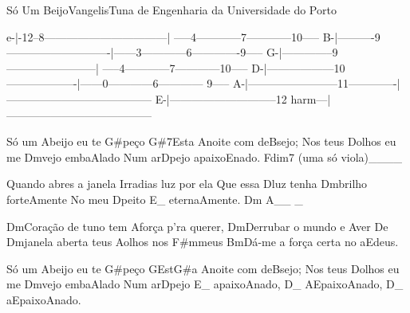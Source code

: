\begin{musica}{Só Um Beijo}{Vangelis}{Tuna de Engenharia da Universidade do Porto}

\begin{tablatura}[xleftmargin=2.0cm]
e-|-12--8---------------------------------| -----4------------7------------10-----
B-|----------9----------------------------|------3------------6-------------9-----
G-|--------------9------------------------| -----4------------7------------10-----
D-|------------------10-------------------|------0------------6------------ 9-----
A-|------------------------11-------------|---------------------------------------
E-|-----------------------------12 harm---|---------------------------------------
\end{tablatura}

Só um \ac{A}{bei}jo eu te \ac{G#}{pe}ço
\ac{G#7}{Es}ta \ac{A}{noi}te com de\ac{B}{se}jo;
Nos teus \ac{D}{o}lhos eu me \ac{Dm}{ve}jo emba\ac{A}{la}do
Num ar\ac{D}{pe}jo apaixo\ac{E}{na}do. \ac{Fdim7 (uma só viola)}{}____

Quando abres a janela
Irradias luz por ela
Que essa \ac{D}{luz} tenha \ac{Dm}{bri}lho forte\ac{A}{men}te
No meu \ac{D}{pei}to \ac{E}{}_ eterna\ac{A}{men}te. \ac{Dm A}{}__ _

\ac{Dm}{Co}ração de tuno tem \ac{A}{for}ça p’ra querer,
\ac{Dm}{De}rrubar o mundo e \ac{A}{ver}
De \ac{Dm}{ja}nela aberta teus \ac{A}{o}lhos nos \ac{F#m}{meus}
\ac{Bm}{Dá}-me a força certa no a\ac{E}{deus}.

\nota{[A/G#/G#/G#7/A/A/B/B/D/Dm/A/D/D/E/Fdim7]}

Só um \ac{A}{bei}jo eu te \ac{G#}{pe}ço
\ac{G}{Es}t\ac{G#}{a} \ac{A}{noi}te com de\ac{B}{se}jo;
Nos teus \ac{D}{o}lhos eu me \ac{Dm}{ve}jo emba\ac{A}{la}do
Num ar\ac{D}{pe}jo \ac{E}{}_ apaixo\ac{A}{na}do,
\ac{D}{}_ A\ac{E}{}paixo\ac{A}{na}do, \ac{D}{}_ a\ac{E}{pai}xo\ac{A}{na}do.

\end{musica}
